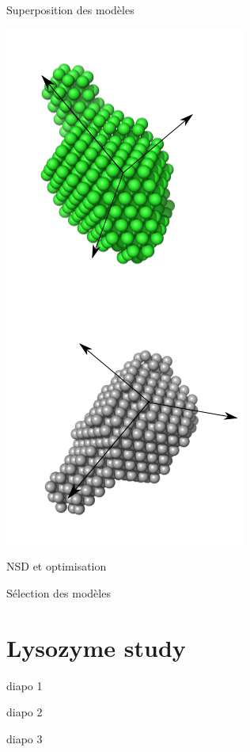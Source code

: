 \documentclass{beamer}
\begin{document}
\begin{frame}{Superposition des mod\`eles}
\begin{minipage}{0.70\linewidth}
\end{minipage} \hfill
\begin{minipage}{0.25\linewidth}
    \includegraphics[scale=0.3]{schemalign.png}
\end{minipage}

\end{frame}

\begin{frame}{NSD et optimisation}
\lipsum[1]
\end{frame}

\begin{frame}{S\'election des mod\`eles}
\lipsum[1]
\end{frame}

\section{Lysozyme study}

\begin{frame}{diapo 1}
\lipsum[1]
\end{frame}

\begin{frame}{diapo 2}
\lipsum[1]
\end{frame}

\begin{frame}{diapo 3}
\lipsum[1]
\end{frame}
\end{document}
